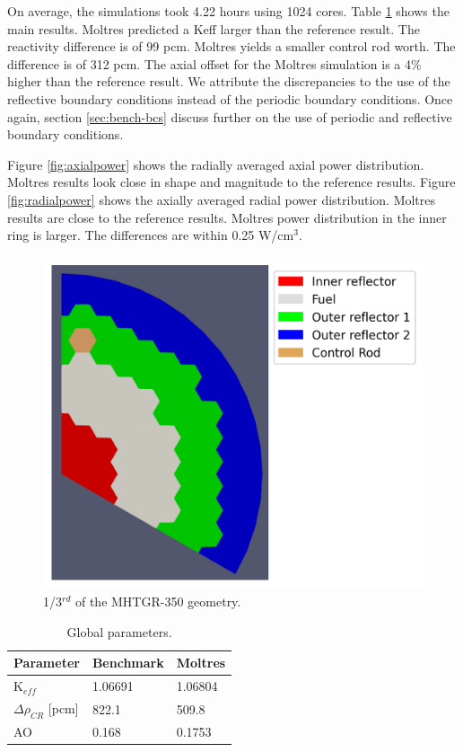\documentclass[11pt,letterpaper]{article}
\begin{document}
On average, the simulations took 4.22 hours using 1024 cores.
Table \ref{tab:globalparam} shows the main results.
Moltres predicted a \gls{Keff} larger than the reference result.
The reactivity difference is of 99 pcm.
Moltres yields a smaller control rod worth.
The difference is of 312 pcm.
The axial offset for the Moltres simulation is a 4$\%$ higher than the reference result.
We attribute the discrepancies to the use of the reflective boundary conditions instead of the periodic boundary conditions.
Once again, section \ref{sec:bench-bcs} discuss further on the use of periodic and reflective boundary conditions.

Figure \ref{fig:axialpower} shows the radially averaged axial power distribution.
Moltres results look close in shape and magnitude to the reference results.
Figure \ref{fig:radialpower} shows the axially averaged radial power distribution.
Moltres results are close to the reference results.
Moltres power distribution in the inner ring is larger.
The differences are within 0.25 W/cm$^3$.

\begin{figure}[htbp!]
	\centering
	\includegraphics[width=0.55\linewidth]{figures-benchmark/oecd-fullcore-legend}
	\hfill
	\caption{1/3$^{rd}$ of the MHTGR-350 geometry.}
	\label{fig:mesh}
\end{figure}

\begin{table}[htbp!]
  \centering
  \caption{Global parameters.}
  \begin{tabular}{l|l|l}
  \toprule
  Parameter 	&  Benchmark  &  Moltres    \\
  \midrule
  K$_{eff}$ 	&  1.06691    &  1.06804    \\
  $\Delta \rho_{CR}$ [pcm]  & 822.1 	& 509.8 \\
  AO        	&  0.168      &  0.1753     \\
  \bottomrule
  \end{tabular}
  \label{tab:globalparam}
\end{table}
\end{document}
